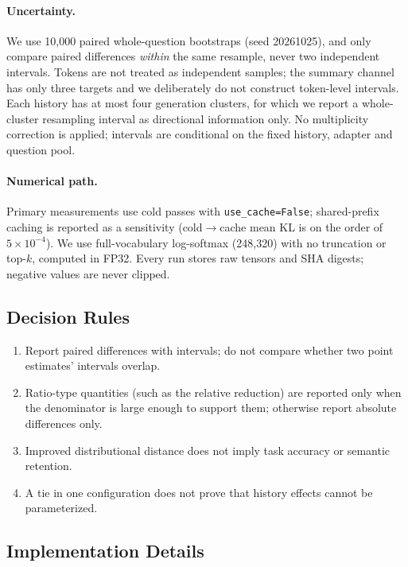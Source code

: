 \documentclass[sigconf,nonacm]{acmart}
\begin{document}
\paragraph{Uncertainty.}

We use 10,000 paired whole-question bootstraps (seed 20261025), and only compare paired differences
\emph{within} the same resample, never two independent intervals. Tokens are not treated as independent
samples; the summary channel has only three targets and we deliberately do not construct token-level
intervals. Each history has at most four generation clusters, for which we report a whole-cluster
resampling interval as directional information only. No multiplicity correction is applied; intervals are
conditional on the fixed history, adapter and question pool.

\paragraph{Numerical path.}

Primary measurements use cold passes with \texttt{use\_cache=False}; shared-prefix caching is reported as
a sensitivity (cold$\to$cache mean KL is on the order of $5\times10^{-4}$). We use full-vocabulary
log-softmax (248,320) with no truncation or top-$k$, computed in FP32. Every run stores raw tensors and
SHA digests; negative values are never clipped.

\subsection{Decision Rules}

\begin{enumerate}[leftmargin=1.2em]
\item Report paired differences with intervals; do not compare whether two point estimates' intervals
overlap.
\item Ratio-type quantities (such as the relative reduction) are reported only when the denominator is large
enough to support them; otherwise report absolute differences only.
\item Improved distributional distance does not imply task accuracy or semantic retention.
\item A tie in one configuration does not prove that history effects cannot be parameterized.
\end{enumerate}

\subsection{Implementation Details}
\end{document}
